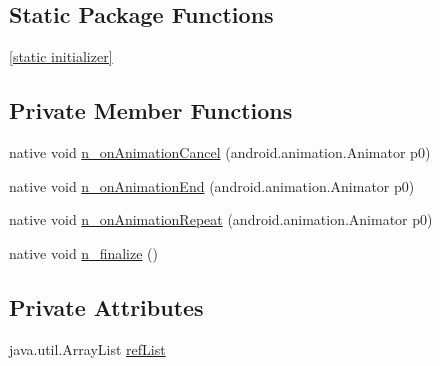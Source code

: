 \subsection*{Static Package Functions}
\begin{CompactItemize}
\item 
\hyperlink{classmd5b60ffeb829f638581ab2bb9b1a7f4f3f_1_1_generic_animator_listener_689835332674b8c7b0475749244ef407}{\mbox{[}static initializer\mbox{]}}
\end{CompactItemize}
\subsection*{Private Member Functions}
\begin{CompactItemize}
\item 
native void \hyperlink{classmd5b60ffeb829f638581ab2bb9b1a7f4f3f_1_1_generic_animator_listener_9c1f1365249743e448d568880950a818}{n\_\-onAnimationCancel} (android.animation.Animator p0)
\item 
native void \hyperlink{classmd5b60ffeb829f638581ab2bb9b1a7f4f3f_1_1_generic_animator_listener_b97205932073aa0d1cfff8ba7cf86b7b}{n\_\-onAnimationEnd} (android.animation.Animator p0)
\item 
native void \hyperlink{classmd5b60ffeb829f638581ab2bb9b1a7f4f3f_1_1_generic_animator_listener_dec99e811e7efcf74f9846282e1ae134}{n\_\-onAnimationRepeat} (android.animation.Animator p0)
\item 
native void \hyperlink{classmd5b60ffeb829f638581ab2bb9b1a7f4f3f_1_1_generic_animator_listener_1a819466d3b0ac0f543306333f159858}{n\_\-finalize} ()
\end{CompactItemize}
\subsection*{Private Attributes}
\begin{CompactItemize}
\item 
java.util.ArrayList \hyperlink{classmd5b60ffeb829f638581ab2bb9b1a7f4f3f_1_1_generic_animator_listener_e2594a26cfe234349eb9ef6ff43c4d1a}{refList}
\end{CompactItemize}


